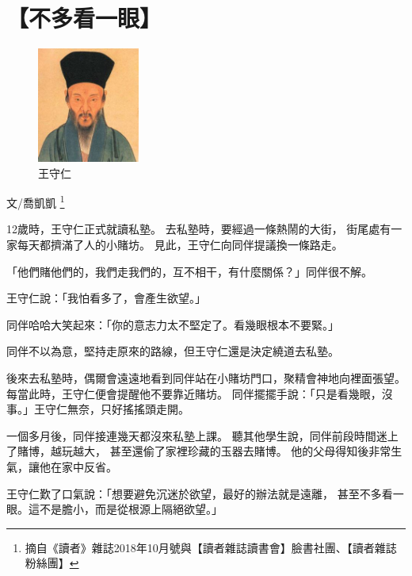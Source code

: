 \chapter{【不多看一眼】}


\begin{figure}
\centering
\includegraphics[width=0.3\textwidth]{pics/p001.jpg}
\vspace{-25pt}
\caption{王守仁}
\end{figure}

文/喬凱凱
\footnote{摘自{\Kai《讀者》}雜誌2018年10月號與【讀者雜誌讀書會】臉書社團、【讀者雜誌粉絲團】}

12歲時，王守仁正式就讀私塾。
去私塾時，要經過一條熱鬧的大街，
街尾處有一家每天都擠滿了人的小賭坊。
見此，王守仁向同伴提議換一條路走。

「他們賭他們的，我們走我們的，互不相干，有什麼關係？」同伴很不解。

王守仁說：「我怕看多了，會產生欲望。」

同伴哈哈大笑起來：「你的意志力太不堅定了。看幾眼根本不要緊。」

同伴不以為意，堅持走原來的路線，但王守仁還是決定繞道去私塾。

後來去私塾時，偶爾會遠遠地看到同伴站在小賭坊門口，聚精會神地向裡面張望。
每當此時，王守仁便會提醒他不要靠近賭坊。
同伴擺擺手說：「只是看幾眼，沒事。」王守仁無奈，只好搖搖頭走開。

一個多月後，同伴接連幾天都沒來私塾上課。
聽其他學生說，同伴前段時間迷上了賭博，越玩越大，
甚至還偷了家裡珍藏的玉器去賭博。
他的父母得知後非常生氣，讓他在家中反省。

王守仁歎了口氣說：「想要避免沉迷於欲望，最好的辦法就是遠離，
甚至不多看一眼。這不是膽小，而是從根源上隔絕欲望。」

